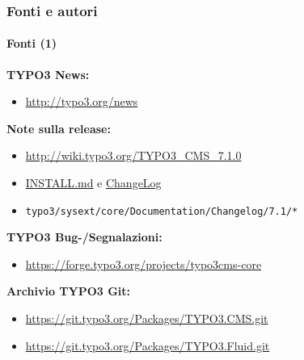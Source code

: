 \begin{frame}[fragile]
	\frametitle{Fonti e autori}
	\framesubtitle{Fonti (1)}

	\textbf{TYPO3 News:}
		\begin{itemize}\smaller
			\item \url{http://typo3.org/news}
		\end{itemize}

	\textbf{Note sulla release:}
		\begin{itemize}\smaller
			\item \url{http://wiki.typo3.org/TYPO3_CMS_7.1.0}
			\item \href{https://github.com/TYPO3/TYPO3.CMS/blob/master/INSTALL.md}{INSTALL.md} e \href{https://github.com/TYPO3/TYPO3.CMS/blob/master/ChangeLog}{ChangeLog}
			\item \texttt{typo3/sysext/core/Documentation/Changelog/7.1/*}
		\end{itemize}

	\textbf{TYPO3 Bug-/Segnalazioni:}
		\begin{itemize}\smaller
			\item \url{https://forge.typo3.org/projects/typo3cms-core}
		\end{itemize}

	\textbf{Archivio TYPO3 Git:}
		\begin{itemize}\smaller
			\item \url{https://git.typo3.org/Packages/TYPO3.CMS.git}
			\item \url{https://git.typo3.org/Packages/TYPO3.Fluid.git}
		\end{itemize}

\end{frame}


